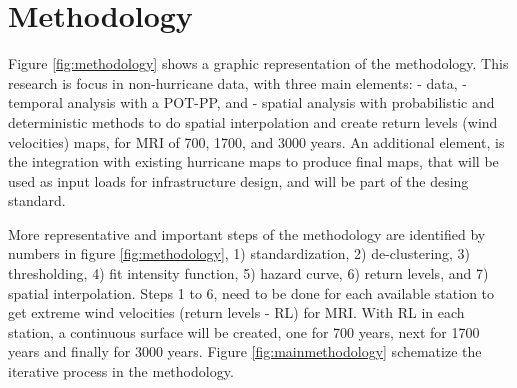 \documentclass[12pt,oneside]{reedthesis}
\begin{document}
\hypertarget{rmd-method}{%
\chapter{Methodology}\label{rmd-method}}

Figure \ref{fig:methodology} shows a graphic representation of the methodology. This research is focus in non-hurricane data, with three main elements: - data, - temporal analysis with a POT-PP, and - spatial analysis with probabilistic and deterministic methods to do spatial interpolation and create return levels (wind velocities) maps, for MRI of 700, 1700, and 3000 years. An additional element, is the integration with existing hurricane maps to produce final maps, that will be used as input loads for infrastructure design, and will be part of the desing standard.

More representative and important steps of the methodology are identified by numbers in figure \ref{fig:methodology}, 1) standardization, 2) de-clustering, 3) thresholding, 4) fit intensity function, 5) hazard curve, 6) return levels, and 7) spatial interpolation. Steps 1 to 6, need to be done for each available station to get extreme wind velocities (return levels - RL) for MRI. With RL in each station, a continuous surface will be created, one for 700 years, next for 1700 years and finally for 3000 years. Figure \ref{fig:mainmethodology} schematize the iterative process in the methodology.
\end{document}

